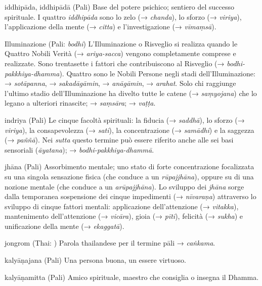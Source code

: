 \begin{glossarydescription}

\item[iddhipāda, iddhipādā] (Pali) Base del potere psichico; sentiero
del successo spirituale. I quattro \emph{iddhipāda} sono lo zelo (→
\emph{chanda}), lo sforzo (→ \emph{viriya}), l'applicazione della mente
(→ \emph{citta}) e l'investigazione (→ \emph{vīmaṃsā}).

\item[Illuminazione] (Pali: \emph{bodhi}) L'Illuminazione o Risveglio si realizza
quando le Quattro Nobili Verità (→ \emph{ariya-sacca}) vengono
completamente comprese e realizzate. Sono trentasette i fattori che
contribuiscono al Risveglio (→ \emph{bodhi-pakkhiya-dhamma}). Quattro
sono le Nobili Persone negli stadi dell'Illuminazione: →
\emph{sotāpanna}, → \emph{sakadāgāmin}, → \emph{anāgāmin}, →
\emph{arahat}. Solo chi raggiunge l'ultimo stadio dell'Illuminazione ha
divelto tutte le catene (→ \emph{saṃyojana}) che lo legano a ulteriori
rinascite; → \emph{saṃsāra}; → \emph{vaṭṭa}.

\item[indriya] (Pali) Le cinque facoltà spirituali: la fiducia (→
\emph{saddhā}), lo sforzo (→ \emph{viriya}), la consapevolezza (→
\emph{sati}), la concentrazione (→ \emph{samādhi}) e la saggezza (→
\emph{paññā}). Nei \emph{sutta} questo termine può essere riferito anche
alle sei basi sensoriali (\emph{āyatana}); →
\emph{bodhi-pakkhiya-dhammā}.


\item[jhāna] (Pali) Assorbimento mentale; uno stato di forte concentrazione
focalizzata su una singola sensazione fisica (che conduce a un
\emph{rūpajjhāna}), oppure su di una nozione mentale (che conduce a un
\emph{arūpajjhāna}). Lo sviluppo dei \emph{jhāna} sorge dalla temporanea
sospensione dei cinque impedimenti (→ \emph{nīvaraṇa}) attraverso lo
sviluppo di cinque fattori mentali: applicazione dell'attenzione (→
\emph{vitakka}), mantenimento dell'attenzione (→ \emph{vicāra}), gioia
(→ \emph{pīti}), felicità (→ \emph{sukha}) e unificazione della mente (→
\emph{ekaggatā}).

\item[jongrom] (Thai: ) Parola thailandese per il termine
pāli → \emph{caṅkama}.


\item[kalyāṇajana] (Pali) Una persona buona, un essere virtuoso.

\item[kalyāṇamitta] (Pali) Amico spirituale, maestro che consiglia o insegna
il Dhamma.


\end{glossarydescription}
